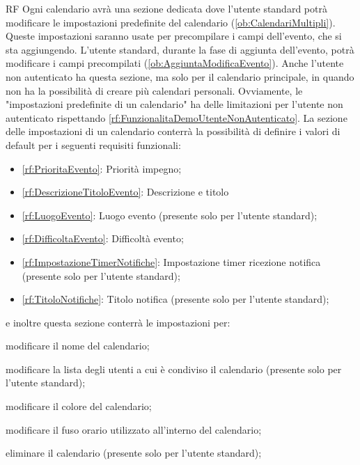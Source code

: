 \begin{listaPersonale}{RF}
	 Ogni calendario avrà una sezione dedicata dove l'utente standard potrà modificare le impostazioni predefinite del calendario (\ref{ob:CalendariMultipli}). Queste impostazioni saranno usate per precompilare i campi dell'evento, che si sta aggiungendo. L'utente standard, durante la fase di aggiunta dell'evento, potrà modificare i campi precompilati (\ref{ob:AggiuntaModificaEvento}). Anche l'utente non autenticato ha questa sezione, ma solo per il calendario principale, in quando non ha la possibilità di creare più calendari personali. Ovviamente, le "impostazioni predefinite di un calendario" ha delle limitazioni per l'utente non autenticato rispettando \ref{rf:FunzionalitaDemoUtenteNonAutenticato}.  La sezione delle impostazioni di un calendario conterrà la possibilità di definire i valori di default per i seguenti requisiti funzionali:
	\begin{itemize}
		\item \ref{rf:PrioritaEvento}: Priorità impegno;
		\item \ref{rf:DescrizioneTitoloEvento}: Descrizione e titolo%
		\item \ref{rf:LuogoEvento}: Luogo evento (presente solo per l'utente standard);
		\item \ref{rf:DifficoltaEvento}: Difficoltà evento;
		\item \ref{rf:ImpostazioneTimerNotifiche}: Impostazione timer ricezione notifica (presente solo per l'utente standard);
		\item \ref{rf:TitoloNotifiche}: Titolo notifica (presente solo per l'utente standard);
	\end{itemize}
	e inoltre questa sezione conterrà le impostazioni per:
	\begin{listaPersonale2}[RF]{}
		 modificare il nome del calendario;

		 modificare la lista degli utenti a cui è condiviso il calendario (presente solo per l'utente standard);

		 modificare il colore del calendario;

		 modificare il fuso orario utilizzato all'interno del calendario;

		 eliminare il calendario (presente solo per l'utente standard);
	\end{listaPersonale2}


\end{listaPersonale}
